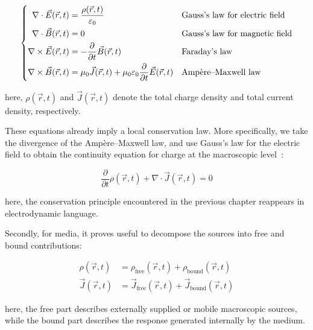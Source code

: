 \begin{equation}
\left\{\begin{aligned}
    \nabla\cdot\vec{E}(\vec{r},t) &= \frac{\rho(\vec{r},t)}{\varepsilon_0} 
    &&\space \text{Gauss's law for electric field} \\
    \nabla\cdot\vec{B}(\vec{r},t) &= 0 
    &&\space \text{Gauss's law for magnetic field} \\
    \nabla\times\vec{E}(\vec{r},t) &= -\frac{\partial}{\partial t}\vec{B}(\vec{r},t) 
    &&\space \text{Faraday's law} \\
    \nabla\times\vec{B}(\vec{r},t) &= \mu_0\vec{J}(\vec{r},t)+\mu_0\varepsilon_0\frac{\partial}{\partial t}\vec{E}(\vec{r},t)
    &&\space \text{Ampère--Maxwell law}
\end{aligned}\right.
\label{maxwell_equations_with_total_sources}
\end{equation}

here, $\rho(\vec{r},t)$ and $\vec{J}(\vec{r},t)$ denote the total charge density and total current density, respectively.

These equations already imply a local conservation law.
More specifically, we take the divergence of the Ampère--Maxwell law,
and use Gauss's law for the electric field to obtain the continuity equation for charge at the macroscopic level~\cite{landau2013electrodynamics}:

\begin{equation}
    \frac{\partial}{\partial t}\rho(\vec{r},t)+\nabla\cdot\vec{J}(\vec{r},t)=0
\label{macroscopic_charge_continuity_equation}
\end{equation}

here, the conservation principle encountered in the previous chapter reappears in electrodynamic language.

Secondly, for media, it proves useful to decompose the sources into free and bound contributions:

\begin{equation}
\begin{aligned}
    \rho(\vec{r},t) &= \rho_\mathrm{free}(\vec{r},t)+\rho_\mathrm{bound}(\vec{r},t) \\
    \vec{J}(\vec{r},t) &= \vec{J}_\mathrm{free}(\vec{r},t)+\vec{J}_\mathrm{bound}(\vec{r},t)
\end{aligned}
\label{free_and_bound_source_decomposition}
\end{equation}

here, the free part describes externally supplied or mobile macroscopic sources,
while the bound part describes the response generated internally by the medium.

